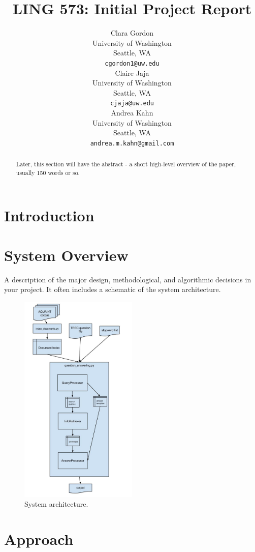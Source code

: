 \documentclass[11pt]{article}
\title{LING 573: Initial Project Report}
\author{Clara Gordon \\
  University of Washington \\
  Seattle, WA \\
  {\tt cgordon1@uw.edu} \\\And
  Claire Jaja \\
  University of Washington \\
  Seattle, WA \\
  {\tt cjaja@uw.edu} \\\And
  Andrea Kahn \\
  University of Washington \\
  Seattle, WA \\
  {\tt andrea.m.kahn@gmail.com} \\}
\date{}
\begin{document}
\maketitle
\begin{abstract}
    Later, this section will have the abstract - a short high-level overview of the paper, usually 150 words or so.
\end{abstract}

\section{Introduction}

\section{System Overview}

A description of the major design, methodological, and algorithmic decisions in your project. It often includes a schematic of the system architecture.

\begin{figure}
  \centering
    \includegraphics[width=0.5\textwidth]{system_architecture.jpg}
 \caption{System architecture.}
\end{figure}

\section{Approach}
\end{document}

